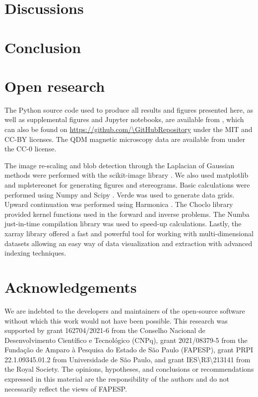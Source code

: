 \section{Discussions}


\section{Conclusion}



\section{Open research}

The Python source code used to produce all results and figures presented here, as well as supplemental figures and Jupyter notebooks, are available from \citet{sourcearchive}, which can also be found on \url{https://github.com/\GitHubRepository} under the MIT and CC-BY licenses.
The QDM magnetic microscopy data are available
from \citet{janinedata} under the CC-0 license.

The image re-scaling and blob detection through the Laplacian of Gaussian
methods were performed with the scikit-image library \citep{VanderWalt2014}.
We also used matplotlib \citep{Hunter2007} and mplstereonet \citep{mplstereonet}
for generating figures and stereograms.
Basic calculations were performed using Numpy \citep{Harris2020} and Scipy
\citep{2020SciPy-NMeth}.
Verde \citep{verde2018} was used to generate data grids.
Upward continuation was performed using Harmonica \citep{harmonica2020}.
The Choclo library \citep{choclo2022} provided kernel functions used in the
forward and inverse problems.
The Numba just-in-time compilation library \citep{lam2015numba} was used to
speed-up calculations.
Lastly, the xarray library \citep{hoyer2017xarray} offered a fast and powerful
tool for working with multi-dimensional datasets allowing an easy way of data
visualization and extraction with advanced indexing techniques.



\section{Acknowledgements}

We are indebted to the developers and maintainers of the open-source software
without which this work would not have been possible.
This research was supported by
grant 162704/2021-6 from the Conselho Nacional de Desenvolvimento Científico e Tecnológico (CNPq),
grant 2021/08379-5 from the Fundação de Amparo à Pesquisa do Estado de São Paulo (FAPESP),
grant PRPI 22.1.09345.01.2 from Universidade de São Paulo,
and grant IES\textbackslash{}R3\textbackslash{}213141 from the Royal Society.
The opinions, hypotheses, and conclusions or recommendations expressed in this
material are the responsibility of the authors and do not necessarily reflect
the views of FAPESP.
